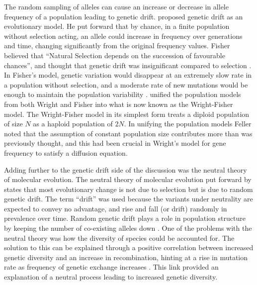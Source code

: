 \documentclass[]{report}
\begin{document}
The random sampling of alleles can cause an increase or decrease in
allele frequency of a population leading to genetic drift.
\citet{Wright1931} proposed genetic drift as an evolutionary model. He
put forward that by chance, in a finite population without selection
acting, an allele could increase in frequency over generations and time,
changing significantly from the original frequency values. Fisher
believed that ``Natural Selection depends on the succession of
favourable chances'', and thought that genetic drift was insignificant
compared to selection \citep{Fisher1930}. In Fisher's model, genetic
variation would disappear at an extremely slow rate in a population
without selection, and a moderate rate of new mutations would be enough
to maintain the population variability \citep{Fisher1922}.
\citet{Feller1951} unified the population models from both Wright and
Fisher into what is now known as the Wright-Fisher model. The
Wright-Fisher model in its simplest form treats a diploid population of
size \(N\) as a haploid population of \(2N\). In unifying the population
models Feller noted that the assumption of constant population size
contributes more than was previously thought, and this had been crucial
in Wright's model for gene frequency to satisfy a diffusion equation.

Adding further to the genetic drift side of the discussion was the
neutral theory of molecular evolution. The neutral theory of molecular
evolution put forward by \citet{Kimura1979a} states that most
evolutionary change is not due to selection but is due to random genetic
drift. The term ``drift'' was used because the variants under neutrality
are expected to convey no advantage, and rise and fall (or drift)
randomly in prevalence over time. Random genetic drift plays a role in
population structure by keeping the number of co-existing alleles down
\citep{Kimura1955}. One of the problems with the neutral theory was how
the diversity of species could be accounted for. The solution to this
can be explained through a positive correlation between increased
genetic diversity and an increase in recombination, hinting at a rise in
mutation rate as frequency of genetic exchange increases
\citep{Hellmann2003}. This link provided an explanation of a neutral
process leading to increased genetic diversity.
\end{document}
